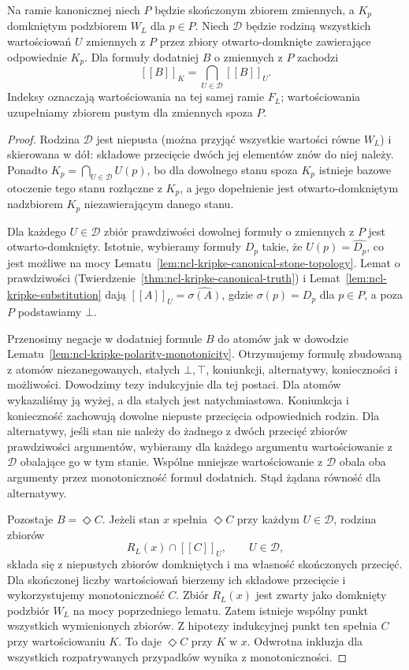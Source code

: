 \begin{lemat}
\label{lem:ncl-kripke-canonical-clopen-approximation}
Na ramie kanonicznej niech $P$ będzie
skończonym zbiorem zmiennych, a $K_p$
domkniętym podzbiorem $W_L$ dla $p\in P$.
Niech $\mathcal D$ będzie rodziną wszystkich
wartościowań $U$ zmiennych z $P$ przez zbiory
otwarto-domknięte zawierające odpowiednie $K_p$.
Dla formuły dodatniej $B$ o zmiennych z $P$
zachodzi
\[
 [\![B]\!]_{K}=\bigcap_{U\in\mathcal D}[\![B]\!]_{U}.
\]
Indeksy oznaczają wartościowania na tej
samej ramie $F_L$; wartościowania
uzupełniamy zbiorem pustym dla zmiennych
spoza $P$.
\end{lemat}
\begin{proof}
Rodzina $\mathcal D$ jest niepusta (można
przyjąć wszystkie wartości równe $W_L$)
i skierowana w dół: składowe przecięcie
dwóch jej elementów znów do niej należy.
Ponadto $K_p=\bigcap_{U\in\mathcal D}U(p)$,
bo dla dowolnego stanu spoza $K_p$ istnieje
bazowe otoczenie tego stanu rozłączne z $K_p$,
a jego dopełnienie jest otwarto-domkniętym
nadzbiorem $K_p$ niezawierającym danego stanu.

Dla każdego $U\in\mathcal D$ zbiór
prawdziwości dowolnej formuły o zmiennych z $P$
jest otwarto-domknięty. Istotnie, wybieramy
formuły $D_p$ takie, że $U(p)=\widehat{D_p}$,
co jest możliwe na mocy
Lematu~\ref{lem:ncl-kripke-canonical-stone-topology}.
Lemat o prawdziwości
(Twierdzenie~\ref{thm:ncl-kripke-canonical-truth})
i Lemat~\ref{lem:ncl-kripke-substitution}
dają $[\![A]\!]_U=\widehat{\sigma(A)}$,
gdzie $\sigma(p)=D_p$ dla $p\in P$,
a poza $P$ podstawiamy $\bot$.

Przenosimy negacje w dodatniej formule $B$
do atomów jak w dowodzie
Lematu~\ref{lem:ncl-kripke-polarity-monotonicity}.
Otrzymujemy formułę zbudowaną z atomów
niezanegowanych, stałych $\bot,\top$,
koniunkcji, alternatywy, konieczności
i możliwości. Dowodzimy tezy indukcyjnie
dla tej postaci. Dla atomów wykazaliśmy
ją wyżej, a dla stałych jest natychmiastowa.
Koniunkcja i konieczność zachowują dowolne
niepuste przecięcia odpowiednich rodzin.
Dla alternatywy, jeśli stan nie należy
do żadnego z dwóch przecięć zbiorów
prawdziwości argumentów, wybieramy dla
każdego argumentu wartościowanie z
$\mathcal D$ obalające go w tym stanie.
Wspólne mniejsze wartościowanie z
$\mathcal D$ obala oba argumenty przez
monotoniczność formuł dodatnich.
Stąd żądana równość dla alternatywy.

Pozostaje $B=\Diamond C$. Jeżeli stan $x$
spełnia $\Diamond C$ przy każdym $U\in\mathcal D$,
rodzina zbiorów
\[
 R_L(x)\cap[\![C]\!]_U,\qquad U\in\mathcal D,
\]
składa się z niepustych zbiorów domkniętych
i ma własność skończonych przecięć.
Dla skończonej liczby wartościowań bierzemy
ich składowe przecięcie i wykorzystujemy
monotoniczność $C$.
Zbiór $R_L(x)$ jest zwarty jako domknięty
podzbiór $W_L$ na mocy poprzedniego lematu.
Zatem istnieje wspólny punkt wszystkich
wymienionych zbiorów. Z hipotezy indukcyjnej
punkt ten spełnia $C$ przy wartościowaniu $K$.
To daje $\Diamond C$ przy $K$ w $x$.
Odwrotna inkluzja dla wszystkich rozpatrywanych
przypadków wynika z monotoniczności.
\end{proof}

